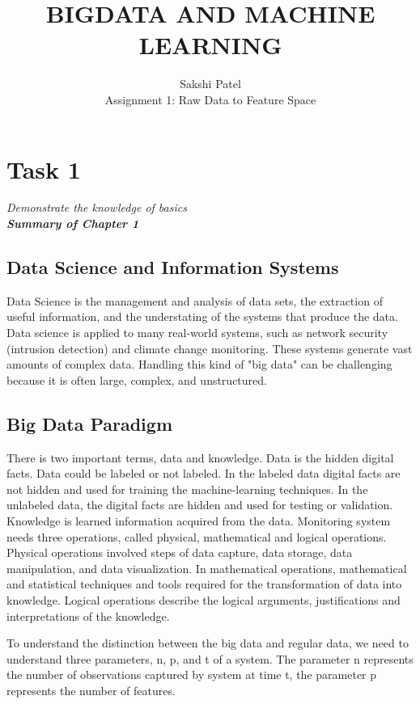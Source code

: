 \documentclass[conference,12pt]{IEEEtran}
\begin{document}
\title{BIGDATA AND MACHINE LEARNING}
\author{Sakshi Patel \\
Assignment 1: Raw Data to Feature Space}
\maketitle

\section{Task 1}
\textit{Demonstrate the knowledge of basics}\\
\textit{\textbf{Summary of Chapter 1}}

\subsection{Data Science and Information Systems}
Data Science is the management and analysis of data sets, the extraction of useful information, and the understating of the systems that produce the data. Data science is applied to many real-world systems, such as network security (intrusion detection) and climate change monitoring. These systems generate vast amounts of complex data. Handling this kind of "big data" can be challenging because it is often large, complex, and unstructured.

\subsection{Big Data Paradigm}
There is two important terms, data and knowledge. Data is the hidden digital facts. Data could be labeled or not labeled. In the labeled data digital facts are not hidden and used for training the machine-learning techniques. In the unlabeled data, the digital facts are hidden and used for testing or validation. Knowledge is learned information acquired from the data. Monitoring system needs three operations, called physical, mathematical and logical operations. Physical operations involved steps of data capture, data storage, data manipulation, and data visualization. In mathematical operations, mathematical and statistical techniques and tools required for the transformation of data into knowledge. Logical operations describe the logical arguments, justifications and interpretations of the knowledge.

To understand the distinction between the big data and regular data, we need to understand three parameters, n, p, and t of a system. The parameter n represents the number of observations captured by system at time t, the parameter p represents the number of features.
\end{document}
